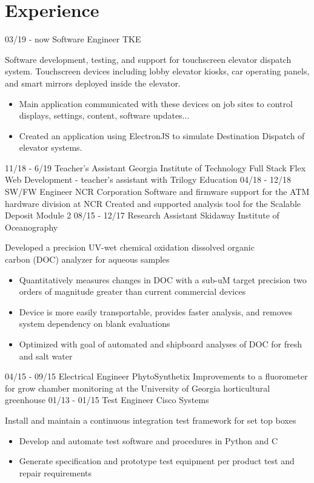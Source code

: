 \documentclass[]{resume}
\begin{document}
\section{Experience}
\begin{entrylist}
\entry 
    {03/19 - now}
    {Software Engineer}
    {TKE}
    {Software development, testing, and support for touchscreen elevator dispatch system. Touchscreen devices including lobby elevator kiosks, car operating panels, and smart mirrors deployed inside the elevator.
        \begin{itemize}
            \item Main application communicated with these devices on job sites to control displays, settings, content, software updates... 
            \item Created an application using ElectronJS to simulate Destination Dispatch of elevator systems.
        \end{itemize}
    }
\entry 
    {11/18 - 6/19}
    {Teacher's Assistant}
    {Georgia Institute of Technology}
    {Full Stack Flex Web Development - teacher's assistant with Trilogy Education}
\entry
    {04/18 - 12/18}
    {SW/FW Engineer}
    {NCR Corporation}
    {Software and firmware support for the ATM hardware division at NCR 
    \newline
    Created and supported analysis tool for the Scalable Deposit Module 2}
  \entry
    {08/15 - 12/17}
    {Research Assistant}
    {Skidaway Institute of Oceanography}
    {Developed a precision UV-wet chemical oxidation dissolved organic\\ carbon (DOC) analyzer for aqueous samples \begin{itemize}
  \item Quantitatively measures changes in DOC with a sub-uM target precision two orders of magnitude greater than current commercial devices
  \item Device is more easily transportable, provides faster analysis, and removes system dependency on blank evaluations
  \item Optimized with goal of automated and shipboard analyses of DOC for fresh and salt water\end{itemize}
  }
  
  \entry
    {04/15 - 09/15}
    {Electrical Engineer}
    {PhytoSynthetix}
    {Improvements to a fluorometer for grow chamber monitoring at the University of Georgia horticultural greenhouse}
    \entry
    {01/13 - 01/15}
    {Test Engineer}
    {Cisco Systems}
    {Install and maintain a continuous integration test framework for set top boxes
        \begin{itemize}
            \item Develop and automate test software and procedures in Python and C
            \item Generate specification and prototype test equipment per product test and repair requirements
        \end{itemize}
    }
\end{entrylist}
\end{document}
